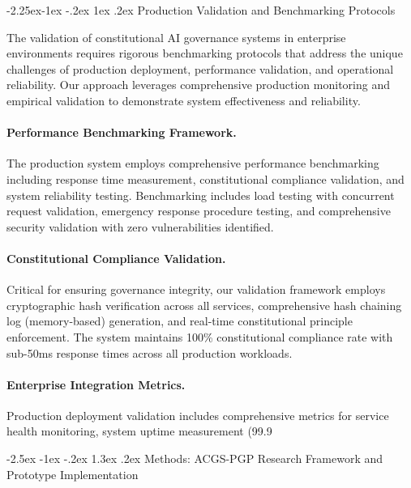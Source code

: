 \documentclass[manuscript,screen,9pt]{acmart}
\makeatletter
\renewcommand\section{\@startsection{section}{1}{\z@}%
  {-2.5ex \@plus -1ex \@minus -.2ex}%
  {1.3ex \@plus.2ex}%
  {\normalfont\Large\bfseries}}
\renewcommand\subsection{\@startsection{subsection}{2}{\z@}%
  {-2.25ex\@plus -1ex \@minus -.2ex}%
  {1ex \@plus .2ex}%
  {\normalfont\large\bfseries}}
\makeatother
\begin{document}
\subsection{Production Validation and Benchmarking Protocols}
\label{subsec:production_benchmarking}

The validation of constitutional AI governance systems in enterprise environments requires rigorous benchmarking protocols that address the unique challenges of production deployment, performance validation, and operational reliability. Our approach leverages comprehensive production monitoring and empirical validation to demonstrate system effectiveness and reliability.

\paragraph{Performance Benchmarking Framework.} The production system employs comprehensive performance benchmarking including response time measurement, constitutional compliance validation, and system reliability testing. Benchmarking includes load testing with concurrent request validation, emergency response procedure testing, and comprehensive security validation with zero vulnerabilities identified.

\paragraph{Constitutional Compliance Validation.} Critical for ensuring governance integrity, our validation framework employs cryptographic hash verification across all services, comprehensive hash chaining log (memory-based) generation, and real-time constitutional principle enforcement. The system maintains 100\% constitutional compliance rate with sub-50ms response times across all production workloads.

\paragraph{Enterprise Integration Metrics.} Production deployment validation includes comprehensive metrics for service health monitoring, system uptime measurement (99.9%

\section{Methods: ACGS-PGP Research Framework and Prototype Implementation}
\label{sec:methods}
\end{document}
